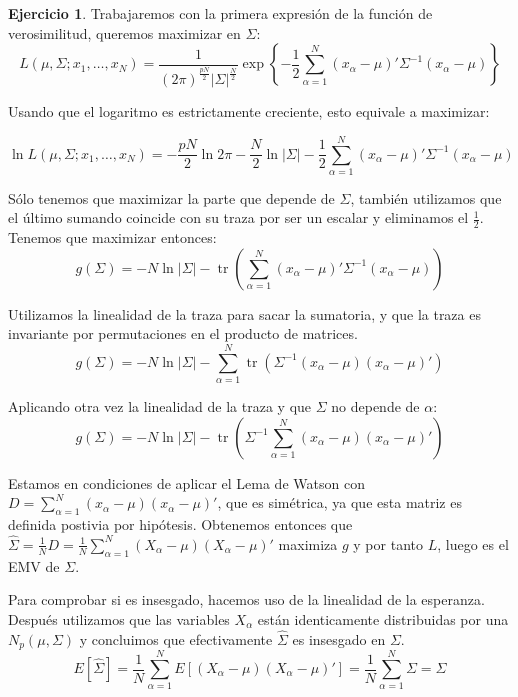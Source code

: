 \documentclass[12pt,spanish]{article}
\theoremstyle{definition}
\newtheorem{exercise}{Ejercicio}
\begin{document}
\begin{exercise} %

  Trabajaremos con la primera expresión de la función de verosimilitud, queremos maximizar en $\Sigma$:
  \[L(\mu,\Sigma;x_1,\ldots,x_N)=\frac{1}{(2\pi)^\frac{pN}{2}|\Sigma|^\frac{N}{2}}\exp\left\{-\frac{1}{2}\sum_{\alpha=1}^N(x_\alpha-\mu)'\Sigma^{-1}(x_\alpha-\mu)\right\}\]

  Usando que el logaritmo es estrictamente creciente, esto equivale a
  maximizar:

  \[\ln L(\mu,\Sigma;x_1,\ldots,x_N)=-\frac{pN}{2}\ln 2\pi-\frac{N}{2}\ln |\Sigma|-\frac{1}{2}\sum_{\alpha=1}^N(x_\alpha-\mu)'\Sigma^{-1}(x_\alpha-\mu)\]

  Sólo tenemos que maximizar la parte que depende de $\Sigma$, también
  utilizamos que el último sumando coincide con su traza por ser un
  escalar y eliminamos el $\frac{1}{2}$. Tenemos que maximizar
  entonces:
  \[g(\Sigma)=-N\ln |\Sigma|-\operatorname{tr}\left(\sum_{\alpha=1}^N(x_\alpha-\mu)'\Sigma^{-1}(x_\alpha-\mu)\right)\]

  Utilizamos la linealidad de la traza para sacar la sumatoria, y que
  la traza es invariante por permutaciones en el producto de matrices.
  \[g(\Sigma)=-N\ln |\Sigma|-\sum_{\alpha=1}^N\operatorname{tr}\left(\Sigma^{-1}(x_\alpha-\mu)(x_\alpha-\mu)'\right)\]

  Aplicando otra vez la linealidad de la traza y que $\Sigma$ no depende de $\alpha$:
  \[g(\Sigma)=-N\ln |\Sigma|-\operatorname{tr}\left(\Sigma^{-1}\sum_{\alpha=1}^N(x_\alpha-\mu)(x_\alpha-\mu)'\right)\]

  Estamos en condiciones de aplicar el Lema de Watson con
  $D=\sum_{\alpha=1}^N(x_\alpha-\mu)(x_\alpha-\mu)'$, que es
  simétrica, ya que esta matriz es definida postivia por
  hipótesis. Obtenemos entonces que
  $\hat{\Sigma}=\frac{1}{N}D=\frac{1}{N}\sum_{\alpha=1}^N(X_\alpha-\mu)(X_\alpha-\mu)'$
  maximiza $g$ y por tanto $L$, luego es el EMV de $\Sigma$.

  Para comprobar si es insesgado, hacemos uso de la linealidad de la
  esperanza. Después utilizamos que las variables $X_\alpha$ están
  identicamente distribuidas por una $N_p(\mu,\Sigma)$ y concluimos
  que efectivamente $\hat{\Sigma}$ es insesgado en $\Sigma$.
  \[E[\hat{\Sigma}]=\frac{1}{N}\sum_{\alpha=1}^NE[(X_\alpha-\mu)(X_\alpha-\mu)']=\frac{1}{N}\sum_{\alpha=1}^N\Sigma=\Sigma\]
\end{exercise}
\end{document}

